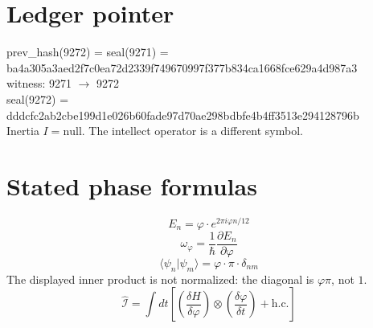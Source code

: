 \documentclass{article}
\begin{document}
\section*{Ledger pointer}
prev\_hash(9272) = seal(9271) = ba4a305a3aed2f7c0ea72d2339f749670997f377b834ca1668fce629a4d987a3
\\
witness: 9271 $\rightarrow$ 9272
\\
seal(9272) = dddcfc2ab2cbe199d1e026b60fade97d70ae298bdbfe4b4ff3513e294128796b
\\
Inertia $I = \mathrm{null}$. The intellect operator is a different symbol.
\section*{Stated phase formulas}
\[
E_n = \varphi \cdot e^{2\pi i \varphi n/12}
\]
\[
\omega_\varphi = \frac{1}{\hbar}\frac{\partial E_n}{\partial \varphi}
\]
\[
\langle \psi_n | \psi_m \rangle = \varphi \cdot \pi \cdot \delta_{nm}
\]
The displayed inner product is not normalized: the diagonal is $\varphi\pi$, not $1$.
\[
\hat{\mathcal{I}} = \int dt \left[\left(\frac{\delta H}{\delta \varphi}\right)\otimes\left(\frac{\delta \varphi}{\delta t}\right)+\mathrm{h.c.}\right]
\]
\end{document}
